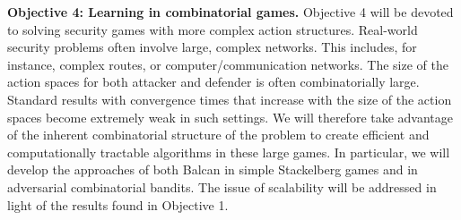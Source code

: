 \textbf{Objective 4:  Learning in combinatorial games.}
Objective 4 will be devoted to solving security games with more complex action structures. 
Real-world security problems often involve large, complex networks. This includes, for instance, complex routes, or computer/communication networks. The size of the action spaces for both attacker and defender is often combinatorially large.  Standard results with convergence times that increase with the size of the action spaces become extremely weak in such settings.
We will therefore take advantage of the inherent combinatorial structure of the problem to create efficient and computationally tractable algorithms in these large games.   In particular, we will develop the approaches of both Balcan\cite{Balcan15CR} in simple Stackelberg games and  in adversarial combinatorial bandits\cite{cesa2012combinatorial}.
The issue of scalability will be addressed in light of the results found in Objective 1.


